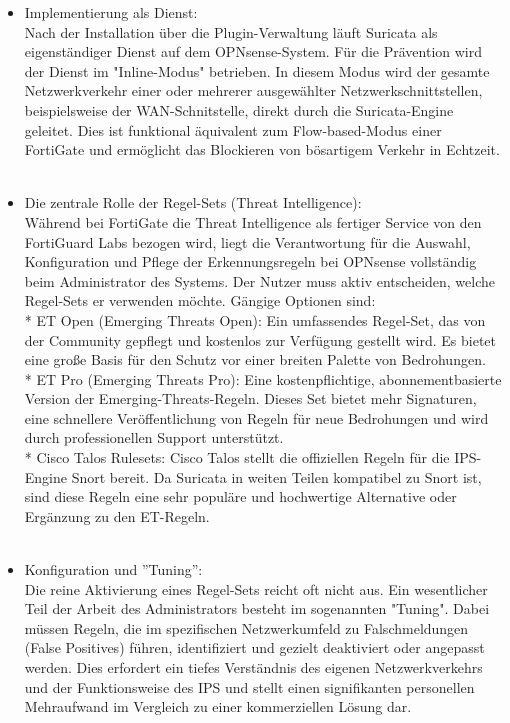 \begin{itemize}
	\item Implementierung als Dienst:\\ Nach der Installation über die Plugin-Verwaltung läuft Suricata als eigenständiger Dienst auf dem OPNsense-System. Für die Prävention wird der Dienst im "Inline-Modus" betrieben. In diesem Modus wird der gesamte Netzwerkverkehr einer oder mehrerer ausgewählter Netzwerkschnittstellen, beispielsweise der WAN-Schnitstelle, direkt durch die Suricata-Engine geleitet. Dies ist funktional äquivalent zum Flow-based-Modus einer FortiGate und ermöglicht das Blockieren von bösartigem Verkehr in Echtzeit.\\\\

	\item Die zentrale Rolle der Regel-Sets (Threat Intelligence):\\ Während bei FortiGate die Threat Intelligence als fertiger Service von den FortiGuard Labs bezogen wird, liegt die Verantwortung für die Auswahl, Konfiguration und Pflege der Erkennungsregeln bei OPNsense vollständig beim Administrator des Systems. Der Nutzer muss aktiv entscheiden, welche Regel-Sets er verwenden möchte. Gängige Optionen sind:\\
* ET Open (Emerging Threats Open): Ein umfassendes Regel-Set, das von der Community gepflegt und kostenlos zur Verfügung gestellt wird. Es bietet eine große Basis für den Schutz vor einer breiten Palette von Bedrohungen.\\
* ET Pro (Emerging Threats Pro): Eine kostenpflichtige, abonnementbasierte Version der Emerging-Threats-Regeln. Dieses Set bietet mehr Signaturen, eine schnellere Veröffentlichung von Regeln für neue Bedrohungen und wird durch professionellen Support unterstützt.\\
* Cisco Talos Rulesets: Cisco Talos stellt die offiziellen Regeln für die IPS-Engine Snort bereit. Da Suricata in weiten Teilen kompatibel zu Snort ist, sind diese Regeln eine sehr populäre und hochwertige Alternative oder Ergänzung zu den ET-Regeln.\\\\

	\item Konfiguration und ''Tuning'': \\Die reine Aktivierung eines Regel-Sets reicht oft nicht aus. Ein wesentlicher Teil der Arbeit des Administrators besteht im sogenannten "Tuning". Dabei müssen Regeln, die im spezifischen Netzwerkumfeld zu Falschmeldungen (False Positives) führen, identifiziert und gezielt deaktiviert oder angepasst werden. Dies erfordert ein tiefes Verständnis des eigenen Netzwerkverkehrs und der Funktionsweise des IPS und stellt einen signifikanten personellen Mehraufwand im Vergleich zu einer kommerziellen Lösung dar.\\\\
\end{itemize}
